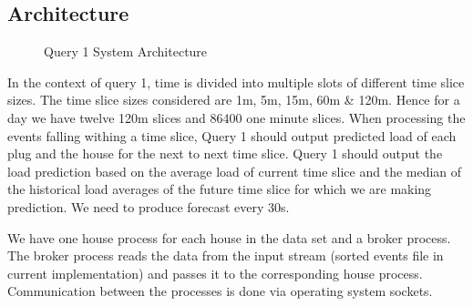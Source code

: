 \subsection{Architecture}

\begin{figure}[h]
\begin{center}
\caption{Query 1 System Architecture}
\end{center}
\end{figure}

In the context of query 1, time is divided into multiple slots of different time slice sizes. The time slice sizes considered are 1m, 5m, 15m, 60m \& 120m. Hence for a day we have twelve 120m slices and 86400 one minute slices. When processing the events falling withing a time slice, Query 1 should output predicted load of each plug and the house for the next to next time slice. Query 1 should output the load prediction based on the average load of current time slice and the median of the historical load averages of the future time slice for which we are making prediction. We need to produce forecast every 30s.

We have one house process for each house in the data set and a broker process. The broker process reads the data from the input stream (sorted events file in current implementation) and passes it to the corresponding house process. Communication between the processes is done via operating system sockets.

